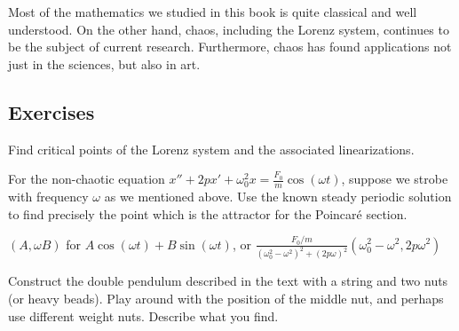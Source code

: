 Most of the mathematics we studied in this book is quite classical and
well understood.
On the other hand, chaos, including the Lorenz system, continues to be the
subject of current research.
Furthermore, chaos has found applications not just in the sciences, but
also in art.

\begin{myfig}
\capstart
{}
\caption{Graph of the $x(t)$ component of the solution.
\label{nlin:lorenz-graphx}}
\end{myfig}

\subsection{Exercises}

\begin{exercise}[*]
Find critical points of the Lorenz system and the associated linearizations.
\end{exercise}

\begin{exercise}
For the non-chaotic equation
$x''+2p x' + \omega_0^2 x = \frac{F_0}{m} \cos (\omega t)$, suppose we
strobe with frequency $\omega$ as we mentioned above.  Use the known
steady periodic solution to find precisely the point which is the attractor
for the Poincar\'e section.
\end{exercise}
\comboSol{%
}
{%
$(A, \omega B)$ for $A \cos(\omega t) + B\sin(\omega t)$, or $\frac{F_0/m}{(\omega_0^2 - \omega^2)^2 + (2p\omega)^2}(\omega_0^2 - \omega^2, 2p\omega^2)$
}

\begin{exercise}[project]
Construct the double pendulum described in the text with a string and two
nuts (or heavy beads).  Play around with the position of the middle nut, and
perhaps use different weight nuts.  Describe what you find.
\end{exercise}

